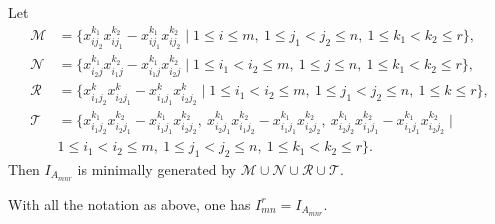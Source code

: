 \documentclass[10pt,a4paper]{amsart}
\begin{document}
\begin{theorem}
\label{thm: mingens}
 Let 
 \begin{align*}
   \mathcal M&=\{x_{ij_2}^{k_1}x_{ij_1}^{k_2}-x_{ij_1}^{k_1}x_{ij_2}^{k_2}\mid 1\le i\le m, \ 1\le j_1<j_2\le n, \ 1\le k_1<k_2\le r\},\\[1ex]
   \mathcal N&=\{x_{i_2j}^{k_1}x_{i_1j}^{k_2}-x_{i_1j}^{k_1}x_{i_2j}^{k_2}\mid 1\le i_1< i_2\le m, \  1\le j\le n, \ 1\le k_1<k_2\le r\},\\[1ex]
   \mathcal R&=\{x_{i_1j_2}^{k}x_{i_2j_1}^{k}-x_{i_1j_1}^{k}x_{i_2j_2}^{k}\mid 1\le i_1< i_2\le m, \  1\le j_1<j_2\le n, \ 1\le k\le r\},\\[1ex] 
   \mathcal T&=\{x_{i_1j_2}^{k_1}x_{i_2j_1}^{k_2}-x_{i_1j_1}^{k_1}x_{i_2j_2}^{k_2}, \ x_{i_2j_1}^{k_1}x_{i_1j_2}^{k_2}-x_{i_1j_1}^{k_1}x_{i_2j_2}^{k_2},\ x_{i_2j_2}^{k_1}x_{i_1j_1}^{k_2}-x_{i_1j_1}^{k_1}x_{i_2j_2}^{k_2}\mid \\& 1\le i_1< i_2\le m, \ 1\le j_1<j_2\le n, \ 1\le k_1<k_2\le r\}.
    \end{align*}
Then $I_{A_{mnr}}$ is minimally generated by $\mathcal M\cup \mathcal N\cup\mathcal R\cup\mathcal T$. 
\end{theorem}

\begin{theorem}
  \label{thm: toric presentation}
  With all the notation as above, one has $I_{mn}^r=I_{A_{mnr}}$.
  \end{theorem}
\end{document}
